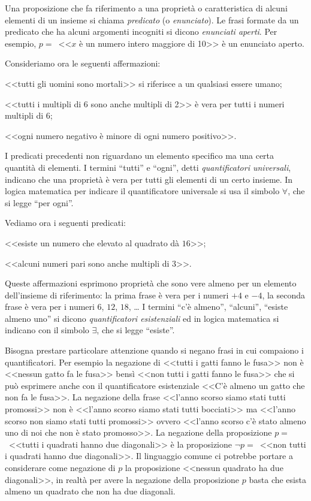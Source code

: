 Una proposizione che fa riferimento a una proprietà o caratteristica 
di alcuni elementi di un insieme si chiama \emph{predicato} (o 
\emph{enunciato}). Le frasi formate da un predicato che ha alcuni 
argomenti incogniti si dicono \emph{enunciati aperti}.
Per esempio, \(p=\)~<<\(x\) è un numero intero maggiore di 10>> è un 
enunciato aperto.

Consideriamo ora le seguenti affermazioni:
\begin{itemize*}
\item <<tutti gli uomini sono mortali>> si riferisce a un qualsiasi 
essere umano;
\item <<tutti i multipli di 6 sono anche multipli di 2>> è vera per 
tutti i numeri multipli di 6;
\item <<ogni numero negativo è minore di ogni numero positivo>>.
\end{itemize*}
I predicati precedenti non riguardano un elemento specifico ma una 
certa quantità di elementi. I termini ``tutti'' e ``ogni'', detti 
\emph{quantificatori universali}, indicano che una proprietà è vera 
per tutti gli elementi di un certo insieme. In logica matematica per 
indicare il quantificatore universale si usa il simbolo \(\forall\), 
che si legge ``per ogni''.

Vediamo ora i seguenti predicati:
\begin{itemize*}
\item <<esiste un numero che elevato al quadrato dà \(16\)>>;
\item <<alcuni numeri pari sono anche multipli di \(3\)>>.
\end{itemize*}
Queste affermazioni esprimono proprietà che sono vere almeno per un 
elemento dell'insieme di riferimento: la prima frase è vera per i 
numeri \(+4\) e \(-4\), la seconda frase è vera per i numeri \(6\), \(12\), 
\(18\), \ldots{}
I termini ``c'è almeno'', ``alcuni'', ``esiste almeno uno'' si dicono 
\emph{quantificatori esistenziali} ed in logica matematica si 
indicano con il simbolo \(\exists\), che si legge ``esiste''.

Bisogna prestare particolare attenzione quando si negano frasi in cui 
compaiono i quantificatori. Per esempio la negazione di <<tutti i 
gatti fanno le fusa>> non è <<nessun gatto fa le fusa>> bensì <<non 
tutti i gatti fanno le fusa>> che si può esprimere anche con il 
quantificatore esistenziale <<C'è almeno un gatto che non fa le 
fusa>>.
La negazione della frase <<l'anno scorso siamo stati tutti promossi>> 
non è <<l'anno scorso siamo stati tutti bocciati>> ma <<l'anno scorso 
non siamo stati tutti promossi>> ovvero <<l'anno scorso c'è stato 
almeno uno di noi che non è stato promosso>>.
La negazione della proposizione \(p=\)~<<tutti i quadrati hanno due 
diagonali>> è la proposizione \({\lnot}p=\)~<<non tutti i quadrati 
hanno due diagonali>>.
Il linguaggio comune ci potrebbe portare a considerare come negazione 
di \(p\) la proposizione <<nessun quadrato ha due diagonali>>, in 
realtà per avere la negazione della proposizione \(p\) basta che esista 
almeno un quadrato che non ha due diagonali.

